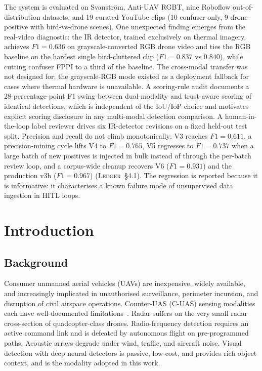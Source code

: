 \documentclass[12pt,a4paper,oneside,openright]{book}
\begin{document}
The system is evaluated on Svanstr\"om, Anti-UAV RGBT, nine Roboflow out-of-distribution datasets, and 19 curated YouTube clips (10 confuser-only, 9 drone-positive with bird-vs-drone scenes). One unexpected finding emerges from the real-video diagnostic: the IR detector, trained exclusively on thermal imagery, achieves $F1=0.636$ on grayscale-converted RGB drone video and ties the RGB baseline on the hardest single bird-cluttered clip ($F1=0.837$ vs $0.840$), while cutting confuser FPPI to a third of the baseline. The cross-modal transfer was not designed for; the grayscale-RGB mode existed as a deployment fallback for cases where thermal hardware is unavailable. A scoring-rule audit documents a 28-percentage-point F1 swing between dual-modality and trust-aware scoring of identical detections, which is independent of the IoU/IoP choice and motivates explicit scoring disclosure in any multi-modal detection comparison. A human-in-the-loop label reviewer drives six IR-detector revisions on a fixed held-out test split. Precision and recall do not climb monotonically: V3 reaches $F1=0.611$, a precision-mining cycle lifts V4 to $F1=0.765$, V5 regresses to $F1=0.737$ when a large batch of new positives is injected in bulk instead of through the per-batch review loop, and a corpus-wide cleanup recovers V6 ($F1=0.931$) and the production v3b ($F1=0.967$) (\textsc{Ledger}~\S4.1). The regression is reported because it is informative: it characterises a known failure mode of unsupervised data ingestion in HITL loops.

\tableofcontents
\newpage
{}
\setcounter{chapter}{0}


\chapter{Introduction}
\label{ch:introduction}

\section{Background}

Consumer unmanned aerial vehicles (UAVs) are inexpensive, widely available, and increasingly implicated in unauthorised surveillance, perimeter incursion, and disruption of civil airspace operations. Counter-UAS (C-UAS) sensing modalities each have well-documented limitations~\cite{shi2018counteruas}. Radar suffers on the very small radar cross-section of quadcopter-class drones. Radio-frequency detection requires an active command link and is defeated by autonomous flight on pre-programmed paths. Acoustic arrays degrade under wind, traffic, and aircraft noise. Visual detection with deep neural detectors is passive, low-cost, and provides rich object context, and is the modality adopted in this work.
\end{document}
